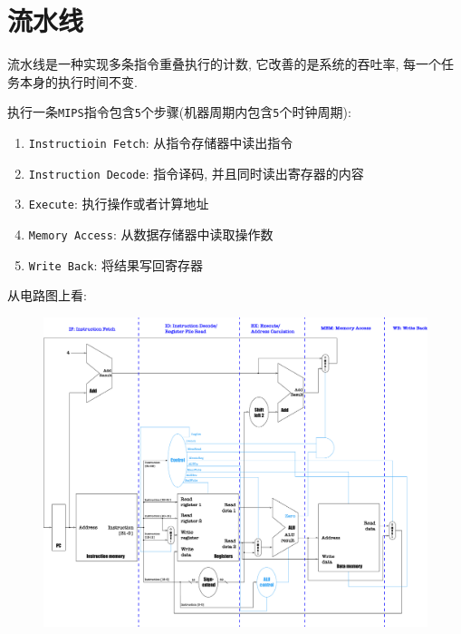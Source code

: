 \section{流水线}
流水线是一种实现多条指令重叠执行的计数, 它改善的是系统的吞吐率, 每一个任务本身的执行时间不变. \par
执行一条\verb|MIPS|指令包含\verb|5|个步骤(机器周期内包含\verb|5|个时钟周期):
\begin{enumerate}
\item \verb|Instructioin Fetch|: 从指令存储器中读出指令
\item \verb|Instruction Decode|: 指令译码, 并且同时读出寄存器的内容
\item \verb|Execute|: 执行操作或者计算地址
\item \verb|Memory Access|: 从数据存储器中读取操作数
\item \verb|Write Back|: 将结果写回寄存器
\end{enumerate}
从电路图上看:
\begin{figure}[H]
\centering
\includegraphics[scale=.2]{img/figure36.pdf}
\end{figure}

















